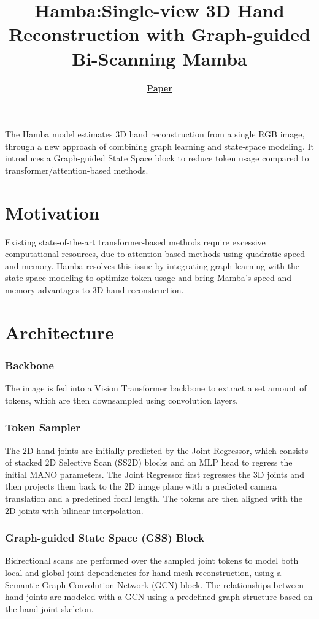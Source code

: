 \documentclass{article}
\title{Hamba:\@ Single-view 3D Hand Reconstruction with Graph-guided Bi-Scanning Mamba}
\author{\textbf{\href{https://arxiv.org/pdf/2407.09646}{Paper}}}
\date{}
\begin{document}
\maketitle

The Hamba model estimates 3D hand reconstruction from a single RGB image, through a new approach of combining graph learning and state-space modeling. It introduces a Graph-guided State Space block to reduce token usage compared to transformer/attention-based methods.

\section*{Motivation}

Existing state-of-the-art transformer-based methods require excessive computational resources, due to attention-based methods using quadratic speed and memory. Hamba resolves this issue by integrating graph learning with the state-space modeling to optimize token usage and bring Mamba's speed and memory advantages to 3D hand reconstruction.

\section*{Architecture}

\subsubsection*{Backbone}

The image is fed into a Vision Transformer backbone to extract a set amount of tokens, which are then downsampled using convolution layers.

\subsubsection*{Token Sampler}

The 2D hand joints are initially predicted by the Joint Regressor, which consists of stacked 2D Selective Scan (SS2D) blocks and an MLP head to regress the initial MANO parameters. The Joint Regressor first regresses the 3D joints and then projects them back to the 2D image plane with a predicted camera translation and a predefined focal length. The tokens are then aligned with the 2D joints with bilinear interpolation.

\subsubsection*{Graph-guided State Space (GSS) Block}
Bidrectional scans are performed over the sampled joint tokens to model both local and global joint dependencies for hand mesh reconstruction, using a Semantic Graph Convolution Network (GCN) block. The relationships between hand joints are modeled with a GCN using a predefined graph structure based on the hand joint skeleton.
\end{document}
